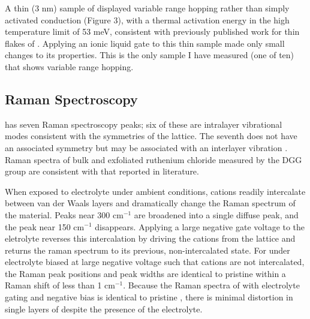 \documentclass[11pt]{article}
\begin{document}
A thin (3 nm) sample of \rucl displayed variable range hopping rather than simply activated conduction (Figure 3), with a thermal activation energy in the high temperature limit of 53 meV, consistent with previously published work for thin flakes of \rucl \cite{Mashhadi2018}. Applying an ionic liquid gate to this thin sample made only small changes to its properties. This is the only sample I have measured (one of ten) that shows variable range hopping.

\subsection{Raman Spectroscopy}

\rucl has seven Raman spectroscopy peaks; six of these are intralayer vibrational modes consistent with the symmetries of the \rucl lattice. The seventh does not have an associated symmetry but may be associated with an interlayer vibration \cite{Zhou2018}. Raman spectra of bulk and exfoliated ruthenium chloride measured by the DGG group are consistent with that reported in literature.

When exposed to electrolyte under ambient conditions, cations readily intercalate between van der Waals layers and dramatically change the Raman spectrum of the material. Peaks near 300 cm$^{-1}$ are broadened into a single diffuse peak, and the peak near 150 cm$^{-1}$ disappears. Applying a large negative gate voltage to the eletrolyte reverses this intercalation by driving the cations from the lattice and returns the raman spectrum to its previous, non-intercalated state. For \rucl under electrolyte biased at large negative voltage such that cations are not intercalated, the Raman peak positions and peak widths are identical to pristine \rucl within a Raman shift of less than 1 cm$^{-1}$. Because the Raman spectra of \rucl with electrolyte gating and negative bias is identical to pristine \ruclnospace , there is minimal distortion in single layers of \rucl despite the presence of the electrolyte.
\end{document}
